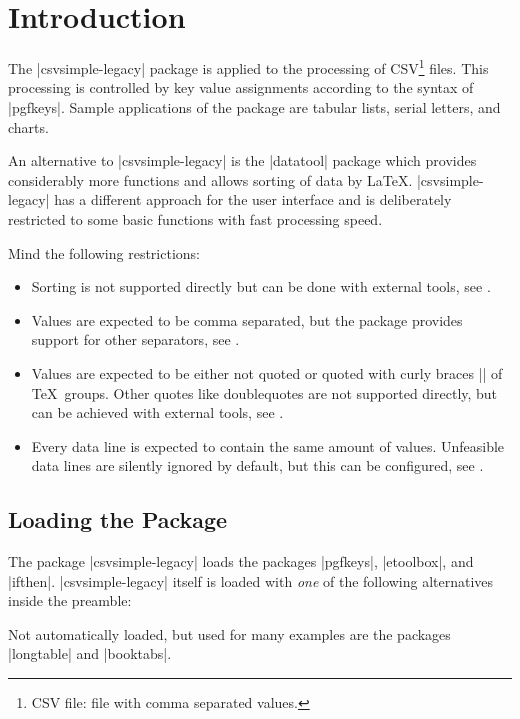 \documentclass[a4paper,11pt]{ltxdoc}
\begin{document}
\clearpage
\tableofcontents

\clearpage
\section{Introduction}%
The |csvsimple-legacy| package is applied to the processing of
CSV\footnote{CSV file: file with comma separated values.} files.
This processing is controlled by key value assignments according to the
syntax of |pgfkeys|. Sample applications of the package
are tabular lists, serial letters, and charts.

An alternative to |csvsimple-legacy| is the |datatool| package
which provides considerably more functions and allows sorting of data by \LaTeX.
|csvsimple-legacy| has a different approach for the user interface and
is deliberately restricted to some basic functions with fast
processing speed.

Mind the following restrictions:
\begin{itemize}
\item Sorting is not supported directly but can be done
  with external tools, see .
\item Values are expected to be comma separated, but the package
  provides support for other separators, see .
\item Values are expected to be either not quoted or quoted with
  curly braces |{}| of \TeX\ groups. Other quotes like doublequotes
  are not supported directly, but can be achieved
  with external tools, see .
\item Every data line is expected to contain the same amount of values.
  Unfeasible data lines are silently ignored by default, but this can
  be configured, see .
\end{itemize}


\subsection{Loading the Package}
The package |csvsimple-legacy| loads the packages
|pgfkeys|,
|etoolbox|,
and |ifthen|.
|csvsimple-legacy| itself is loaded with \emph{one} of the following
alternatives inside the preamble:
\begin{dispListing}
\usepackage[legacy]{csvsimple}
\usepackage{csvsimple-legacy}
\end{dispListing}


Not automatically loaded, but used for many examples are the packages
|longtable|
and
|booktabs|.
\end{document}

